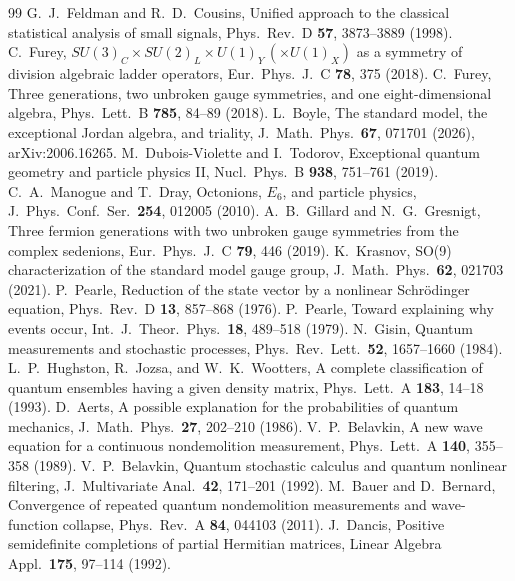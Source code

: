 \documentclass[aps,pra,onecolumn,superscriptaddress,nofootinbib,10pt]{revtex4-2}
\theoremstyle{definition}
\theoremstyle{remark}
\begin{document}
\begin{thebibliography}{99}
 G.~J.~Feldman and R.~D.~Cousins, Unified approach to the classical statistical analysis of small signals, Phys.\ Rev.\ D \textbf{57}, 3873--3889 (1998).
 C.~Furey, $SU(3)_C\times SU(2)_L\times U(1)_Y\,(\times U(1)_X)$ as a symmetry of division algebraic ladder operators, Eur.\ Phys.\ J.\ C \textbf{78}, 375 (2018).
 C.~Furey, Three generations, two unbroken gauge symmetries, and one eight-dimensional algebra, Phys.\ Lett.\ B \textbf{785}, 84--89 (2018).
 L.~Boyle, The standard model, the exceptional Jordan algebra, and triality, J.\ Math.\ Phys.\ \textbf{67}, 071701 (2026), arXiv:2006.16265.
 M.~Dubois-Violette and I.~Todorov, Exceptional quantum geometry and particle physics II, Nucl.\ Phys.\ B \textbf{938}, 751--761 (2019).
 C.~A.~Manogue and T.~Dray, Octonions, $E_6$, and particle physics, J.\ Phys.\ Conf.\ Ser.\ \textbf{254}, 012005 (2010).
 A.~B.~Gillard and N.~G.~Gresnigt, Three fermion generations with two unbroken gauge symmetries from the complex sedenions, Eur.\ Phys.\ J.\ C \textbf{79}, 446 (2019).
 K.~Krasnov, SO(9) characterization of the standard model gauge group, J.\ Math.\ Phys.\ \textbf{62}, 021703 (2021).
 P.~Pearle, Reduction of the state vector by a nonlinear Schr\"odinger equation, Phys.\ Rev.\ D \textbf{13}, 857--868 (1976).
 P.~Pearle, Toward explaining why events occur, Int.\ J.\ Theor.\ Phys.\ \textbf{18}, 489--518 (1979).
 N.~Gisin, Quantum measurements and stochastic processes, Phys.\ Rev.\ Lett.\ \textbf{52}, 1657--1660 (1984).
 L.~P.~Hughston, R.~Jozsa, and W.~K.~Wootters, A complete classification of quantum ensembles having a given density matrix, Phys.\ Lett.\ A \textbf{183}, 14--18 (1993).
 D.~Aerts, A possible explanation for the probabilities of quantum mechanics, J.\ Math.\ Phys.\ \textbf{27}, 202--210 (1986).
 V.~P.~Belavkin, A new wave equation for a continuous nondemolition measurement, Phys.\ Lett.\ A \textbf{140}, 355--358 (1989).
 V.~P.~Belavkin, Quantum stochastic calculus and quantum nonlinear filtering, J.\ Multivariate Anal.\ \textbf{42}, 171--201 (1992).
 M.~Bauer and D.~Bernard, Convergence of repeated quantum nondemolition measurements and wave-function collapse, Phys.\ Rev.\ A \textbf{84}, 044103 (2011).
 J.~Dancis, Positive semidefinite completions of partial Hermitian matrices, Linear Algebra Appl.\ \textbf{175}, 97--114 (1992).

\end{thebibliography}
\end{document}

